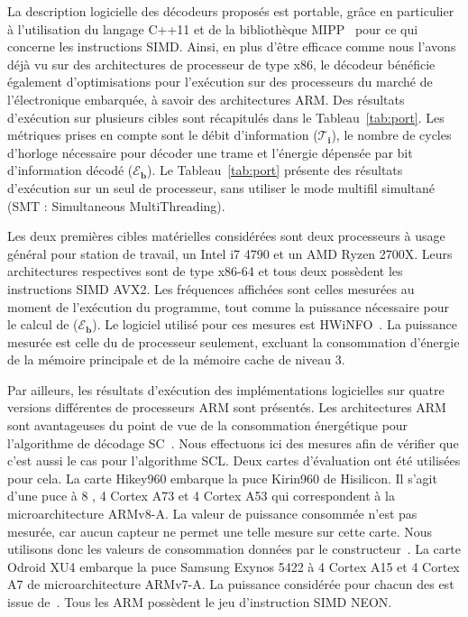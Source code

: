 \begin{table}[ht]
{{\begin{tabular}{r|c|c|c c c c| c c c| c c c}
    \end{tabular}
    }}
  \end{table}

La description logicielle des décodeurs proposés est portable, grâce en particulier à l'utilisation du langage C++11 et de la bibliothèque MIPP~\cite{cassagne2018mipp} pour ce qui concerne les instructions SIMD. Ainsi, en plus d'être efficace comme nous l'avons déjà vu sur des architectures de processeur de type x86, le décodeur bénéficie également d'optimisations pour l'exécution sur des processeurs du marché de l'électronique embarquée, à savoir des architectures ARM. Des résultats d'exécution sur plusieurs cibles sont récapitulés dans le Tableau~\ref{tab:port}. Les métriques prises en compte sont le débit d'information ($\bm{\mathcal{T}_i}$), le nombre de cycles d'horloge nécessaire pour décoder une trame et l'énergie dépensée par bit d'information décodé ($\bm{\mathcal{E}_b}$). Le Tableau~\ref{tab:port}  présente des résultats d'exécution sur un seul \coeur de processeur, sans utiliser le mode multifil simultané (SMT : Simultaneous MultiThreading).

Les deux premières cibles matérielles considérées sont deux processeurs à usage général pour station de travail, un Intel i7 4790 et un AMD Ryzen 2700X. Leurs architectures respectives sont de type x86-64 et tous deux possèdent les instructions SIMD AVX2. Les fréquences affichées sont celles mesurées au moment de l'exécution du programme, tout comme la puissance nécessaire pour le calcul de ($\bm{\mathcal{E}_b}$). Le logiciel utilisé pour ces mesures est HWiNFO~\cite{noauthor_hwinfo_nodate}. La puissance mesurée est celle du \coeur de processeur seulement, excluant la consommation d'énergie de la mémoire principale et de la mémoire cache de niveau 3.

Par ailleurs, les résultats d'exécution des implémentations logicielles sur quatre versions différentes de processeurs ARM sont présentés. Les architectures ARM sont avantageuses du point de vue de la consommation énergétique pour l'algorithme de décodage SC~\cite{cassagne_energy_2016}. Nous effectuons ici des mesures afin de vérifier que c'est aussi le cas pour l'algorithme SCL. Deux cartes d'évaluation ont été utilisées pour cela. La carte Hikey960 embarque la puce Kirin960 de Hisilicon. Il s'agit d'une puce à 8 \coeurs, 4 Cortex A73 et 4 Cortex A53 qui correspondent à la microarchitecture ARMv8-A. La valeur de puissance consommée n'est pas mesurée, car aucun capteur ne permet une telle mesure sur cette carte. Nous utilisons donc les valeurs de consommation données par le constructeur~\cite{humrick_hisilicon_nodate}. La carte Odroid XU4 embarque la puce Samsung Exynos 5422 à 4 \coeurs Cortex A15 et 4 \coeurs Cortex A7 de microarchitecture ARMv7-A. La puissance considérée pour chacun des \coeurs est issue de~\cite{holmgren_energy_nodate,benmoussa_performance_nodate}. Tous les \coeurs ARM possèdent le jeu d'instruction SIMD NEON.

